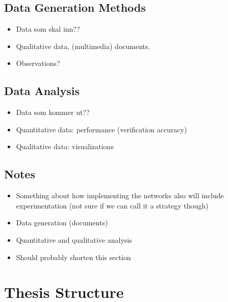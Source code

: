 \subsection{Data Generation Methods}

\begin{itemize}
    \item Data som skal inn??
    \item Qualitative data, (multimedia) documents.
    \item Observations?
\end{itemize}

\subsection{Data Analysis}

\begin{itemize}
    \item Data som kommer ut??
    \item Quantitative data: performance (verification accuracy)
    \item Qualitative data: visualizations
\end{itemize}

\subsection{Notes}
\begin{itemize}
    \item Something about how implementing the networks also will include experimentation (not sure if we can call it a strategy though)
    \item Data generation (documents)
    \item Quantitative and qualitative analysis
    \item Should probably shorten this section
\end{itemize}

\section{Thesis Structure}

